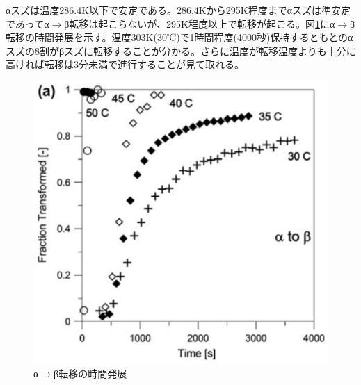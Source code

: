 αスズは温度286.4K以下で安定である。286.4Kから295K程度までαスズは準安定であってα$\to$β転移は起こらないが、295K程度以上で転移が起こる。図\ref{fig:alpha-to-beta}にα$\to$β転移の時間発展を示す\cite{Nogita}。温度303K(30℃)で1時間程度(4000秒)保持するともとのαスズの8割がβスズに転移することが分かる。さらに温度が転移温度よりも十分に高ければ転移は3分未満で進行することが見て取れる。
\begin{figure}[!h]
  \begin{center}
   \includegraphics[width=0.5\hsize]{Introduction/alpha-to-beta.eps}
  \end{center}
  \caption{α$\to$β転移の時間発展\cite{Nogita}}
  \label{fig:alpha-to-beta}
  \end{figure}

